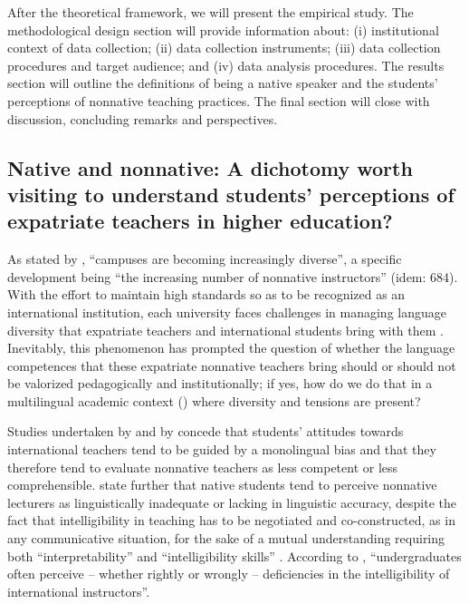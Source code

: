 \documentclass[output=paper]{../langscibook}
\begin{document}
After the theoretical framework, we will present the empirical study. The methodological design section will provide information about: (i) institutional context of data collection; (ii) data collection instruments; (iii) data collection procedures and target audience; and (iv) data analysis procedures. The results section will outline the definitions of being a native speaker and the students’ perceptions of nonnative teaching practices. The final section will close with discussion, concluding remarks and perspectives.

\subsection{Native and nonnative: A dichotomy worth visiting to understand students’ perceptions of expatriate teachers in higher education?}

As stated by \citet[683]{KangEtAl2015}, “campuses are becoming increasingly diverse”, a specific development being “the increasing number of nonnative instructors” (idem: 684). With the effort to maintain high standards so as to be recognized as an international institution, each university faces challenges in managing language diversity that expatriate teachers and international students bring with them \citep{Yanaprasart2018}. Inevitably, this phenomenon has prompted the question of whether the language competences that these expatriate nonnative teachers bring should or should not be valorized pedagogically and institutionally; if yes, how do we do that in a multilingual academic context (\citealt{BlommaertVerschueren1998}) where diversity and tensions are present?

Studies undertaken by \citet{Subtirelu2015} and by \citet{KangEtAl2015} concede that students’ attitudes towards international teachers tend to be guided by a monolingual bias and that they therefore tend to evaluate nonnative teachers as less competent or less comprehensible. \citet{KangEtAl2015} state further that native students tend to perceive nonnative lecturers as linguistically inadequate or lacking in linguistic accuracy, despite the fact that intelligibility in teaching has to be negotiated and co-constructed, as in any communicative situation, for the sake of a mutual understanding requiring both “interpretability” and “intelligibility skills” \citep{Candlin1982}. According to \citet[684]{KangEtAl2015}, “undergraduates often perceive – whether rightly or wrongly – deficiencies in the intelligibility of international instructors”.
\end{document}

